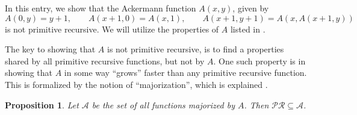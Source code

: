 \documentclass[12pt]{article}
\newtheorem{prop}{Proposition}
\begin{document}
In this entry, we show that the Ackermann function $A(x,y)$, given by $$A(0,y)=y+1, \qquad A(x+1,0)=A(x,1), \qquad A(x+1,y+1) = A(x,A(x+1,y))$$
is not primitive recursive.  We will utilize the properties of $A$ listed in .

The key to showing that $A$ is not primitive recursive, is to find a properties shared by all primitive recursive functions, but not by $A$.  One such property is in showing that $A$ in some way ``grows'' faster than any primitive recursive function.  This is formalized by the notion of ``majorization'', which is explained .

\begin{prop} Let $\mathcal{A}$ be the set of all functions majorized by $A$.  Then $\mathcal{PR} \subseteq \mathcal{A}$.  \end{prop}
\end{document}
